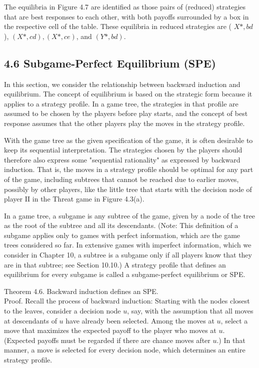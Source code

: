 \documentclass[12pt]{article}
\begin{document}
The equilibria in Figure 4.7 are identified as those pairs of (reduced) strategies that are best responses to each other, with both payoffs surrounded by a box in the respective cell of the table. These equilibria in reduced strategies are ( $X *, b d$ ), $(X *, c d),(X *, c e)$, and $(Y *, b d)$.

\subsection*{4.6 Subgame-Perfect Equilibrium (SPE)}
In this section, we consider the relationship between backward induction and equilibrium. The concept of equilibrium is based on the strategic form because it applies to a strategy profile. In a game tree, the strategies in that profile are assumed to be chosen by the players before play starts, and the concept of best response assumes that the other players play the moves in the strategy profile.

With the game tree as the given specification of the game, it is often desirable to keep its sequential interpretation. The strategies chosen by the players should therefore also express some "sequential rationality" as expressed by backward induction. That is, the moves in a strategy profile should be optimal for any part of the game, including subtrees that cannot be reached due to earlier moves, possibly by other players, like the little tree that starts with the decision node of player II in the Threat game in Figure 4.3(a).

In a game tree, a subgame is any subtree of the game, given by a node of the tree as the root of the subtree and all its descendants. (Note: This definition of a subgame applies only to games with perfect information, which are the game trees considered so far. In extensive games with imperfect information, which we consider in Chapter 10, a subtree is a subgame only if all players know that they are in that subtree; see Section 10.10.) A strategy profile that defines an equilibrium for every subgame is called a subgame-perfect equilibrium or SPE.

Theorem 4.6. Backward induction defines an SPE.\\
Proof. Recall the process of backward induction: Starting with the nodes closest to the leaves, consider a decision node $u$, say, with the assumption that all moves at descendants of $u$ have already been selected. Among the moves at $u$, select a move that maximizes the expected payoff to the player who moves at $u$. (Expected payoffs must be regarded if there are chance moves after $u$.) In that manner, a move is selected for every decision node, which determines an entire strategy profile.
\end{document}
